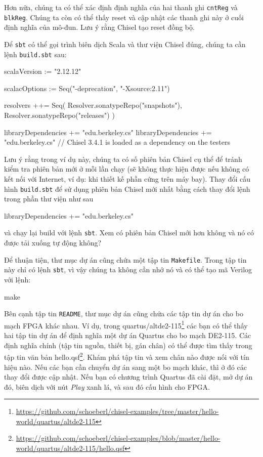 \documentclass[%
    10pt,
    headinclude, footexclude,
    openright, %
    notitlepage,
    cleardoubleempty,
    headsepline,
    pointlessnumbers,
    bibtotoc, idxtotoc,
    ]{scrbook}
\newcommand{\code}[1]{{\small{\texttt{#1}}}}
\newcommand{\myref}[2]{\href{#1}{#2}}
\renewcommand{\myref}[2]{{#2}{\footnote{\url{#1}}}}
\begin{document}
Hơn nữa, chúng ta có thể xác định định nghĩa của hai thanh ghi \code{cntReg} và \code{blkReg}.
Chúng ta còn có thể thấy reset và cập nhật các thanh ghi này ở cuối định nghĩa của mô-đun.
Lưu ý rằng Chisel tạo reset đồng bộ.

Để \code{sbt} có thể gọi trình biên dịch Scala và thư viện Chisel đúng,
chúng ta cần lệnh \code{build.sbt} sau:

\begin{chisel}
scalaVersion := "2.12.12"

scalacOptions := Seq("-deprecation", "-Xsource:2.11")

resolvers ++= Seq(
  Resolver.sonatypeRepo("snapshots"),
  Resolver.sonatypeRepo("releases")
)

libraryDependencies += "edu.berkeley.cs" %
libraryDependencies += "edu.berkeley.cs" %
// Chisel 3.4.1 is loaded as a dependency on the testers
\end{chisel}

\noindent Lưu ý rằng trong ví dụ này, chúng ta có số phiên bản Chisel cụ thể để tránh kiểm tra 
phiên bản mới ở mỗi lần chạy (sẽ không thực hiện được nếu không có kết nối với Internet, 
ví dụ: khi thiết kế phần cứng trên máy bay).
Thay đổi cấu hình \code{build.sbt} để sử dụng phiên bản Chisel mới nhất bằng cách thay đổi 
lệnh trong phần thư viện như sau
\begin{chisel}
libraryDependencies += "edu.berkeley.cs" %
\end{chisel}

\noindent và chạy lại build với lệnh \code{sbt}. Xem có phiên bản Chisel mới hơn không và 
nó có được tải xuống tự động không? 

Để thuận tiện, thư mục dự án cũng chứa một tập tin \code{Makefile}.
Trong tập tin này chỉ có lệnh \code{sbt}, vì vậy chúng ta không cần nhớ nó 
và có thể tạo mã Verilog với lệnh:

\begin{chisel}
make
\end{chisel}

Bên cạnh tập tin \code{README}, thư mục dự án cũng chứa các tập tin dự án cho bo mạch FPGA khác nhau.
Ví dụ, trong
\myref{https://github.com/schoeberl/chisel-examples/tree/master/hello-world/quartus/altde2-115}{quartus/altde2-115} 
các bạn có thể thấy hai tập tin dự án để định nghĩa một dự án Quartus cho bo mạch DE2-115. 
Các định nghĩa chính (tập tin nguồn, thiết bị, gán chân) có thể được tìm thấy trong tập tin văn bản
\myref{https://github.com/schoeberl/chisel-examples/blob/master/hello-world/quartus/altde2-115/hello.qsf}{hello.qsf}.
Khám phá tập tin và xem chân nào được nối với tín hiệu nào.
Nếu các bạn cần chuyển dự án sang một bo mạch khác, thì ở đó các thay đổi được cập nhật.
Nếu bạn có chương trình Quartus đã cài đặt, mở dự án đó, biên dịch với nút \emph{Play} xanh lá,
và sau đó cấu hình cho FPGA.
\end{document}
